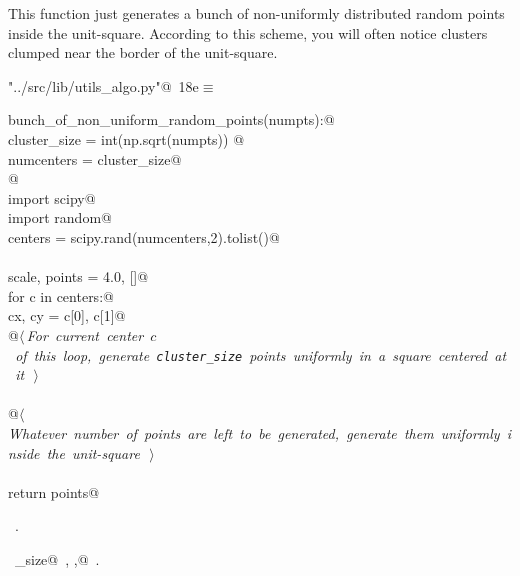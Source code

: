 \documentclass[11.5pt]{report}
\begin{document}
\vspace{-0.8cm} \newchunk This function just generates a bunch of non-uniformly distributed
random points inside the unit-square. According to this scheme, you will often notice
clusters clumped near the border of the unit-square. 
\begin{flushleft} \small\label{scrap18}\raggedright\small
{} \verb@"../src/lib/utils_algo.py"@\nobreak\ {\footnotesize {18e}}$\equiv$
\vspace{-1ex}
\begin{list}{}{} \item
\mbox{}\verb@def bunch_of_non_uniform_random_points(numpts):@\\
\mbox{}\verb@    cluster_size = int(np.sqrt(numpts)) @\\
\mbox{}\verb@    numcenters   = cluster_size@\\
\mbox{}\verb@    @\\
\mbox{}\verb@    import scipy@\\
\mbox{}\verb@    import random@\\
\mbox{}\verb@    centers = scipy.rand(numcenters,2).tolist()@\\
\mbox{}\verb@@\\
\mbox{}\verb@    scale, points = 4.0, []@\\
\mbox{}\verb@    for c in centers:@\\
\mbox{}\verb@        cx, cy = c[0], c[1]@\\
\mbox{}\verb@        @\hbox{$\langle\,${\itshape For current center $c$ of this loop, generate \verb|cluster_size| points uniformly in a square centered at it}\nobreak\ {\footnotesize {}}$\,\rangle$}\verb@@\\
\mbox{}\verb@@\\
\mbox{}\verb@    @\hbox{$\langle\,${\itshape Whatever number of points are left to be generated, generate them uniformly inside the unit-square}\nobreak\ {\footnotesize {}}$\,\rangle$}\verb@@\\
\mbox{}\verb@@\\
\mbox{}\verb@    return points@\\
\mbox{}\verb@@{\NWsep}
\end{list}
\vspace{-1.5ex}
\footnotesize
\begin{list}{}{\setlength{\itemsep}{-\parsep}\setlength{\itemindent}{-\leftmargin}}
\item \NWtxtFileDefBy\ .
\item \NWtxtIdentsDefed\nobreak\  \verb@cluster_size@\nobreak\ , \verb@scale,@\nobreak\ .
\item{}
\end{list}
\vspace{4ex}
\end{flushleft}
\end{document}

